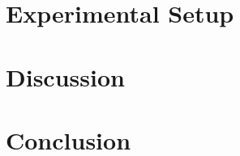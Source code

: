 \documentclass[conference]{IEEEtran}
\begin{document}
\section{Experimental Setup}




%
%
\section{Discussion}




%
%
\section{Conclusion}


\printbibliography
\end{document}
